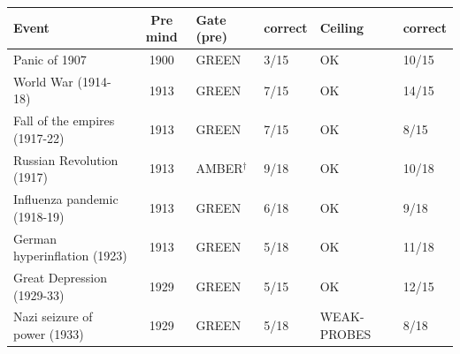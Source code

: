 \begin{tabular}{lcllll}
\toprule
Event & Pre mind & Gate (pre) & correct & Ceiling & correct \\
\midrule
Panic of 1907 & 1900 & GREEN & 3/15 & OK & 10/15 \\
World War (1914-18) & 1913 & GREEN & 7/15 & OK & 14/15 \\
Fall of the empires (1917-22) & 1913 & GREEN & 7/15 & OK & 8/15 \\
Russian Revolution (1917) & 1913 & AMBER$^{\dagger}$ & 9/18 & OK & 10/18 \\
Influenza pandemic (1918-19) & 1913 & GREEN & 6/18 & OK & 9/18 \\
German hyperinflation (1923) & 1913 & GREEN & 5/18 & OK & 11/18 \\
Great Depression (1929-33) & 1929 & GREEN & 5/15 & OK & 12/15 \\
Nazi seizure of power (1933) & 1929 & GREEN & 5/18 & WEAK-PROBES & 8/18 \\
\bottomrule
\end{tabular}